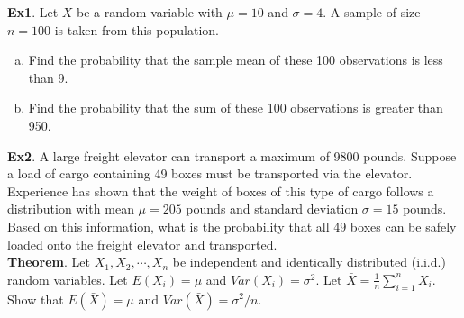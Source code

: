 \documentclass[fleqn]{article}\usepackage[]{graphicx}\usepackage[]{color}
\begin{document}
\textbf{Ex1}.  Let $X$ be a random variable with $\mu = 10$ and $\sigma = 4$.  A sample of size $n=100$ is taken from this population. 
\begin{enumerate}[(a)]
\item Find the probability that the sample mean of these 100 observations is less than 9.\\
\vspace{5cm}

% 

\item Find the probability that the sum of these 100 observations is greater than 950.\\
\vspace{5cm}

% 
\end{enumerate}

\textbf{Ex2}.  A large freight elevator can transport a maximum of 9800 pounds.  Suppose a load of cargo containing 49 boxes must be transported via the elevator.  Experience has shown that the weight of boxes of this type of cargo follows a distribution with mean $\mu=205$ pounds and standard deviation $\sigma = 15$ pounds.  Based on this information, what is the probability that all 49 boxes can be safely loaded onto the freight elevator and transported.\\

% 
% 
\clearpage
\textbf{Theorem}.  Let $X_1, X_2, \cdots, X_n$ be independent and identically distributed (i.i.d.) random variables.  Let $E(X_i) = \mu$ and $Var(X_i) = \sigma^2$.  Let $\bar{X} = \frac{1}{n} \sum_{i=1}^n X_i$.  Show that $E(\bar{X}) = \mu$ and $Var(\bar{X}) = \sigma^2 / n$.\\
\end{document}
